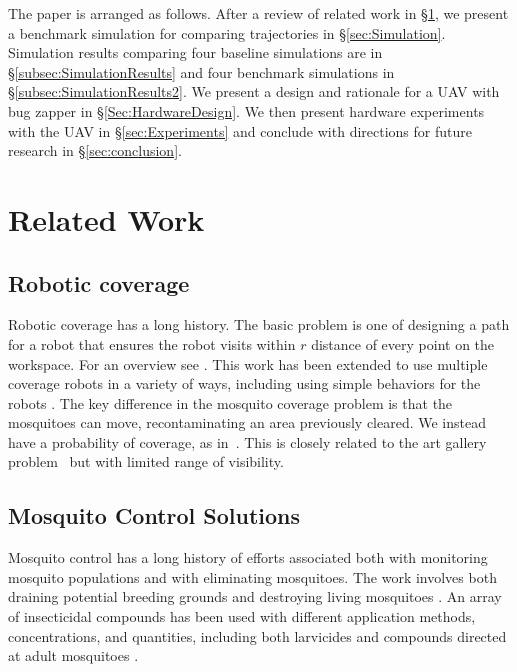 \documentclass[letterpaper, 10 pt, conference]{ieeeconf}  %
\begin{document}

  The paper is arranged as follows.  
  After a review of related work in \S \ref{sec:relatedWork},
    we present a benchmark simulation for comparing trajectories in \S \ref{sec:Simulation}.
     Simulation results comparing four baseline simulations are in \S \ref{subsec:SimulationResults} and four benchmark simulations in \S \ref{subsec:SimulationResults2}.
  We present a design and rationale for a UAV with bug zapper in \S  \ref{Sec:HardwareDesign}.
  We then present hardware experiments with the UAV  in \S  \ref{sec:Experiments} and conclude with directions for future research  in \S  \ref{sec:conclusion}.
  
  
 

  \section{Related Work}\label{sec:relatedWork}
  
      \subsection{Robotic coverage}
    Robotic coverage has a long history. The basic problem is one of designing a path for a robot that ensures the robot visits within $r$ distance of every point on the workspace.  For an overview see \cite{Choset2001}.  This work has been extended to use multiple coverage robots in a variety of ways, including using simple behaviors for the robots \cite{spears2006physics,Koenig2001}.
    The key difference in the mosquito coverage problem is that the mosquitoes can move, recontaminating an area previously cleared. We instead have a probability of coverage, as in~\cite{Das2011}.  This is closely related to the art gallery problem~\cite{lee1986computational} but with limited range of visibility.
    
  \subsection{Mosquito Control Solutions}
  
	Mosquito control has a long history of efforts associated both with monitoring mosquito populations \cite{dennett2007associations} and with eliminating mosquitoes.  The work involves both draining potential breeding grounds and destroying living mosquitoes \cite{peter2005tick}.  An array of insecticidal compounds has been used with different application methods, concentrations, and quantities, including both larvicides and compounds directed at adult mosquitoes \cite{larvicides2005guidelines}.
	
\end{document}
